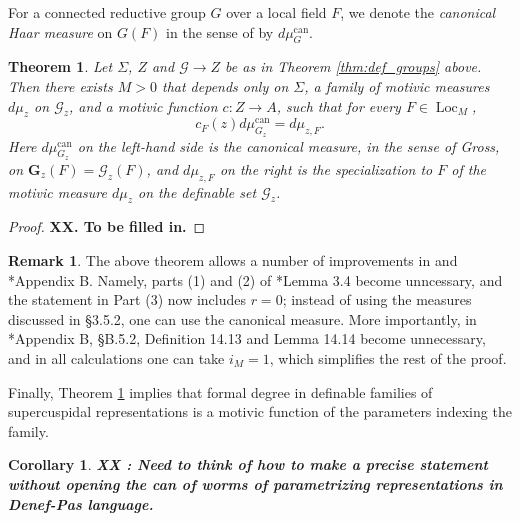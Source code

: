 \documentclass{amsart}
\newcommand{\loc}{\operatorname{Loc}}
\newcommand{\bG}{\mathbf{G}}
\newcommand{\can}{\mathrm{can}}
\newcommand{\cG}{\mathcal{G}}
\theoremstyle{plain}
\newtheorem{theorem}[thm]{Theorem}
\newtheorem{cor}[thm]{Corollary}
\theoremstyle{definition}
\newtheorem{rem}[thm]{Remark}
\begin{document}
For a connected reductive group $G$ over a local field $F$, we denote the \emph{canonical Haar measure} on $G(F)$ in the sense of \cite{gross:motive} by $d\mu_G^\can$. 
\begin{theorem}\label{thm:mot_meas}
 Let $\Sigma$, $Z$  and $\cG \to Z$ be as in Theorem \ref{thm:def_groups} above. 
Then there exists $M>0$ that depends only on 
$\Sigma$, a family of  motivic measures $d\mu_z$ on $\cG_z$, and a motivic function $c:Z\to A$, such that for every $F\in \loc_M$,
$$c_F(z) d\mu_{G_z}^\can = d\mu_{z, F}.$$ 
Here $d\mu_{G_z}^\can$ on the left-hand side is the canonical measure, in the sense of Gross, on 
$\bG_z(F)=\cG_z(F)$, and $d\mu_{z, F}$ on the right is the specialization to $F$ of the motivic measure $d\mu_z$ on the definable set $\cG_z$. 
\end{theorem} 

\begin{proof} {\bf XX. To be filled in.}
\end{proof}

\begin{rem} The above theorem allows a number of improvements in \cite{CGH-2} and 
\cite{S-T}*{Appendix B}. 
Namely,  parts (1) and (2) of \cite{CGH-2}*{Lemma 3.4} become unncessary, and the statement in Part (3) now includes $r=0$; instead of using the measures discussed in \S 3.5.2, one can use the canonical measure. 
More importantly, in \cite{S-T}*{Appendix B, \S B.5.2}, Definition 14.13 and Lemma 14.14 become unnecessary, and in all calculations one can take $i_M=1$, which simplifies the rest of the proof.
\end{rem}

Finally, Theorem \ref{thm:mot_meas} implies that formal degree in definable families of supercuspidal representations is a motivic function of the parameters indexing the family. 
\begin{cor}
{\bf XX : Need to think of how to make a precise statement without opening the can of worms of parametrizing representations in Denef-Pas language.}
\end{cor}


\begin{bibdiv}
\begin{biblist}
\end{biblist}
\end{bibdiv}
\end{document}
